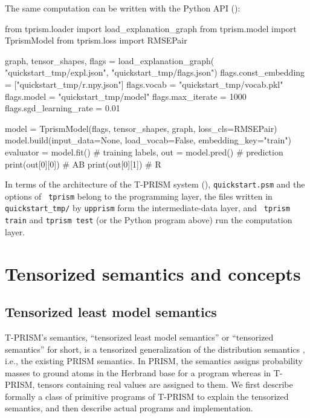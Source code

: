 \documentclass[a4paper]{report}
\begin{document}
The same computation can be written with the Python API
():
\begin{pythoncode}
from tprism.loader import load_explanation_graph
from tprism.model import TprismModel
from tprism.loss import RMSEPair

graph, tensor_shapes, flags = load_explanation_graph(
    "quickstart_tmp/expl.json", "quickstart_tmp/flags.json")
flags.const_embedding = ["quickstart_tmp/r.npy.json"]
flags.vocab = "quickstart_tmp/vocab.pkl"
flags.model = "quickstart_tmp/model"
flags.max_iterate = 1000
flags.sgd_learning_rate = 0.01

model = TprismModel(flags, tensor_shapes, graph, loss_cls=RMSEPair)
model.build(input_data=None, load_vocab=False, embedding_key="train")
evaluator = model.fit()             # training
labels, out = model.pred()          # prediction
print(out[0][0])                    # AB
print(out[0][1])                    # R
\end{pythoncode}
In terms of the architecture of the T-PRISM system
(), {\tt quickstart.psm} and the options of {\tt
	tprism} belong to the programming layer, the files written in {\tt
	quickstart\_tmp/} by {\tt upprism} form the intermediate-data layer, and {\tt
	tprism train} and {\tt tprism test} (or the Python program above) run the
computation layer.

\chapter{Tensorized semantics and concepts}
\label{chap:tprism_semantics}

\section{Tensorized least model semantics}
\label{sec:semantics}

T-PRISM's   semantics,  ``tensorized   least   model  semantics''   or
``tensorized semantics'' for short,  is a tensorized generalization of
the  distribution semantics  \cite{Sato95}, i.e.,  the existing  PRISM
semantics.  In  PRISM, the  semantics  assigns  probability masses  to
ground atoms  in the Herbrand base  for a program whereas  in T-PRISM,
tensors containing real values are assigned to them.
We first describe formally a class of primitive programs of T-PRISM to
explain the  tensorized semantics,  and then describe  actual programs
and implementation.
\end{document}
